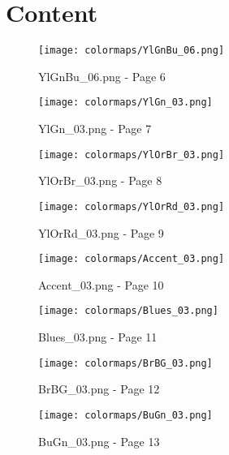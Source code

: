 \documentclass{article}%
\begin{document}
%
\normalsize%
\section{Content}%
\label{sec:Content}%


\begin{figure}[h!]%
\centering%
\texttt{[image: colormaps/YlGnBu\_06.png]}%
\caption{YlGnBu\_06.png {-} Page 6}%
\end{figure}

%


\begin{figure}[h!]%
\centering%
\texttt{[image: colormaps/YlGn\_03.png]}%
\caption{YlGn\_03.png {-} Page 7}%
\end{figure}

%


\begin{figure}[h!]%
\centering%
\texttt{[image: colormaps/YlOrBr\_03.png]}%
\caption{YlOrBr\_03.png {-} Page 8}%
\end{figure}

%


\begin{figure}[h!]%
\centering%
\texttt{[image: colormaps/YlOrRd\_03.png]}%
\caption{YlOrRd\_03.png {-} Page 9}%
\end{figure}

%


\begin{figure}[h!]%
\centering%
\texttt{[image: colormaps/Accent\_03.png]}%
\caption{Accent\_03.png {-} Page 10}%
\end{figure}

%


\begin{figure}[h!]%
\centering%
\texttt{[image: colormaps/Blues\_03.png]}%
\caption{Blues\_03.png {-} Page 11}%
\end{figure}

%


\begin{figure}[h!]%
\centering%
\texttt{[image: colormaps/BrBG\_03.png]}%
\caption{BrBG\_03.png {-} Page 12}%
\end{figure}

%


\begin{figure}[h!]%
\centering%
\texttt{[image: colormaps/BuGn\_03.png]}%
\caption{BuGn\_03.png {-} Page 13}%
\end{figure}
\end{document}
